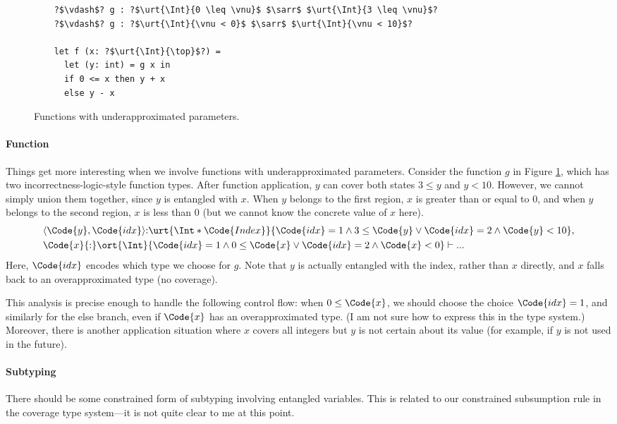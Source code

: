 \begin{figure}[h]
    \centering
    \begin{verbatim}
    ?$\vdash$? g : ?$\urt{\Int}{0 \leq \vnu}$ $\sarr$ $\urt{\Int}{3 \leq \vnu}$?
    ?$\vdash$? g : ?$\urt{\Int}{\vnu < 0}$ $\sarr$ $\urt{\Int}{\vnu < 10}$?

    let f (x: ?$\urt{\Int}{\top}$?) =
      let (y: int) = g x in
      if 0 <= x then y + x
      else y - x
    \end{verbatim}
    \caption{Functions with underapproximated parameters.}
    \label{fig:function-entanglement}
\end{figure}

\paragraph{Function} Things get more interesting when we involve functions with underapproximated parameters. Consider the function $g$ in Figure \ref{fig:function-entanglement}, which has two incorrectness-logic-style function types. After function application, $y$ can cover both states $3 \leq y$ and $y < 10$. However, we cannot simply union them together, since $y$ is entangled with $x$. When $y$ belongs to the first region, $x$ is greater than or equal to $0$, and when $y$ belongs to the second region, $x$ is less than $0$ (but we cannot know the concrete value of $x$ here).
\begin{align*}
    &\langle\Code{y}, \Code{idx}\rangle{:} \urt{\Int*\Code{Index}}{\Code{idx} = 1 \land 3 \leq \Code{y} \lor \Code{idx} = 2 \land \Code{y} < 10}, 
    \\&\Code{x}{:}\ort{\Int}{\Code{idx} = 1 \land 0 \leq \Code{x} \lor \Code{idx} = 2 \land \Code{x} < 0} \vdash ...
\end{align*}\noindent
Here, $\Code{idx}$ encodes which type we choose for $g$. Note that $y$ is actually entangled with the index, rather than $x$ directly, and $x$ falls back to an overapproximated type (no coverage).

This analysis is precise enough to handle the following control flow: when $0 \leq \Code{x}$, we should choose the choice $\Code{idx} = 1$, and similarly for the else branch, even if $\Code{x}$ has an overapproximated type. (I am not sure how to express this in the type system.)
Moreover, there is another application situation where $x$ covers all integers but $y$ is not certain about its value (for example, if $y$ is not used in the future).

\paragraph{Subtyping} There should be some constrained form of subtyping involving entangled variables. This is related to our constrained subsumption rule in the coverage type system—it is not quite clear to me at this point.